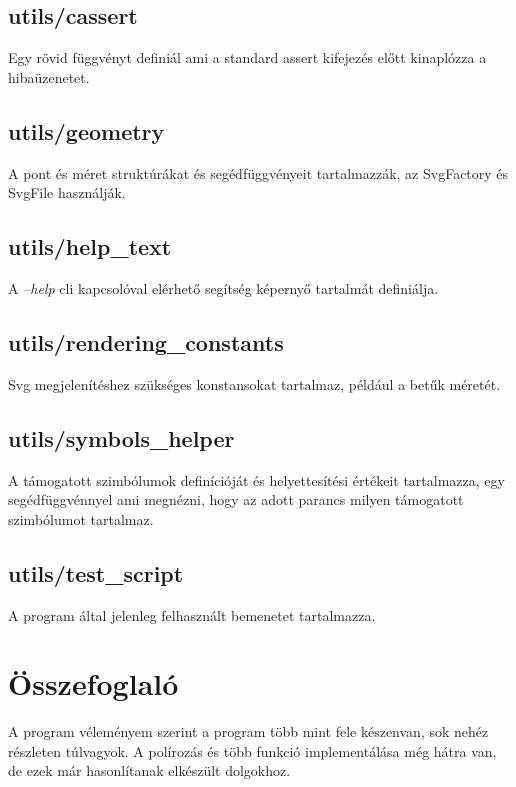 \documentclass{article}[12pt,a4paper]
\newcommand{\lang}[1]{\textit{#1}}
\begin{document}
    \subsection{utils/cassert}
    Egy rövid függvényt definiál ami a standard assert kifejezés előtt kinaplózza a hibaüzenetet.

    \subsection{utils/geometry}
    A pont és méret struktúrákat és segédfüggvényeit tartalmazzák, az SvgFactory és SvgFile használják.

    \subsection{utils/help\_text}
    A \lang{--help} cli kapcsolóval elérhető segítség képernyő tartalmát definiálja.

    \subsection{utils/rendering\_constants}
    Svg megjelenítéshez szükséges konstansokat tartalmaz, például a betűk méretét.

    \subsection{utils/symbols\_helper}
    A támogatott szimbólumok definícióját és helyettesítési értékeit tartalmazza, egy segédfüggvénnyel ami megnézni, hogy az adott parancs milyen támogatott szimbólumot tartalmaz.

    \subsection{utils/test\_script}
    A program által jelenleg felhasznált bemenetet tartalmazza.

    \section{Összefoglaló}
    A program véleményem szerint a program több mint fele készenvan, sok nehéz részleten túlvagyok.
    A polírozás és több funkció implementálása még hátra van, de ezek már hasonlítanak elkészült dolgokhoz.
\end{document}
